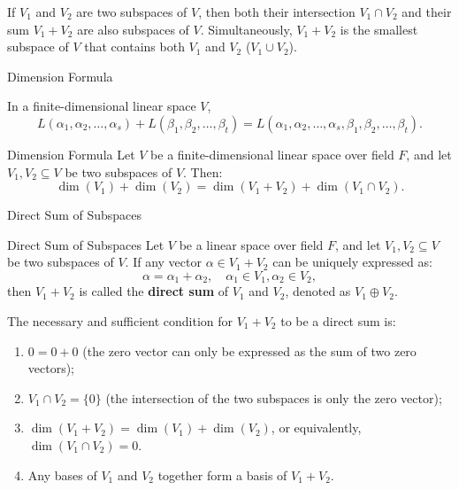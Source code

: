 \documentclass[11pt]{../../TexTemplate/elegantbook} %
\begin{document}
If \( V_1 \) and \( V_2 \) are two subspaces of \( V \), 
then both their intersection \( V_1 \cap V_2 \) and their sum \( V_1 + V_2 \) are also subspaces of \( V \).
Simultaneously, \( V_{1}+V_{2} \) is the smallest subspace of \( V \) 
that contains both \( V_1 \) and \( V_2 \) (\(V_{1}\cup V_{2}\)).

\begin{leftbarTitle}{Dimension Formula}\end{leftbarTitle}
\begin{proposition}
    In a finite-dimensional linear space \( V \),
    \[
    L(\alpha_1, \alpha_2, \dots, \alpha_s) + L(\beta_1, \beta_2, \dots, \beta_t) = 
    L(\alpha_1, \alpha_2, \dots, \alpha_s, \beta_1, \beta_2, \dots, \beta_t).
    \]
\end{proposition}

\begin{theorem}{Dimension Formula}
    Let \( V \) be a finite-dimensional linear space over field \( F \), 
    and let \( V_1, V_2 \subseteq V \) be two subspaces of \( V \). Then:
    \[
    \dim(V_1) + \dim(V_2) = \dim(V_1 + V_2) + \dim(V_1 \cap V_2).
    \]
    
\end{theorem}

\begin{leftbarTitle}{Direct Sum of Subspaces}\end{leftbarTitle}
\begin{definition}{Direct Sum of Subspaces}
    Let \( V \) be a linear space over field \( F \), 
    and let \( V_1, V_2 \subseteq V \) be two subspaces of \( V \).
    If any vector \( \alpha \in V_1 + V_2 \) can be uniquely expressed as:
    \[
    \alpha = \alpha_1 + \alpha_2, \quad \alpha_1 \in V_1, \alpha_2 \in V_2,
    \]
    then \( V_1 + V_2 \) is called the \textbf{direct sum} of \( V_1 \) and \( V_2 \),
    denoted as \( V_1 \oplus V_2 \).
\end{definition}

\begin{proposition}
    The necessary and sufficient condition for \( V_1 + V_2 \) to be a direct sum is:
    \begin{enumerate}
        \item \(0 = 0 + 0\) (the zero vector can only be expressed as the sum of two zero vectors); 
        \item \( V_1 \cap V_2 = \{0\} \) (the intersection of the two subspaces is only the zero vector);
        \item \(\operatorname{dim}(V_{1}+V_{2})=\operatorname{dim}(V_{1})+\operatorname{dim}(V_{2})\),
            or equivalently, \(\operatorname{dim}(V_{1} \cap V_{2})=0\).
        \item Any bases of \( V_1 \) and \( V_2 \) together form a basis of \( V_1 + V_2 \).
    \end{enumerate}
\end{proposition}
\end{document}
